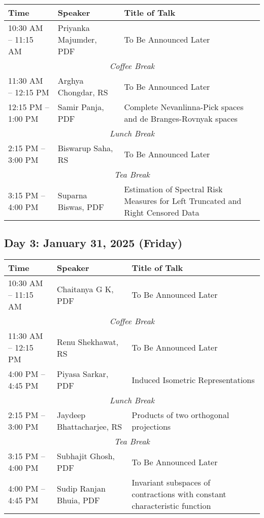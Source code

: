 \noindent
\renewcommand{\arraystretch}{1.5} %
\begin{tabular}{|p{3.5cm}|p{4cm}|p{7cm}|}
	\hline
	\textbf{Time} & \textbf{Speaker} & \textbf{Title of Talk} \\
	\hline
	10:30 AM -- 11:15 AM & Priyanka Majumder, PDF & To Be Announced Later \\
	\hline
	\multicolumn{3}{|c|}{\textit{Coffee Break}} \\
	\hline
	11:30 AM -- 12:15 PM & Arghya Chongdar, RS & To Be Announced Later \\
	\hline
	12:15 PM -- 1:00 PM & Samir Panja, PDF & Complete Nevanlinna-Pick spaces and de Branges-Rovnyak spaces \\
	\hline
	\multicolumn{3}{|c|}{\textit{Lunch Break}} \\
	\hline
	2:15 PM -- 3:00 PM & Biswarup Saha, RS & To Be Announced Later \\
	\hline
	\multicolumn{3}{|c|}{\textit{Tea Break}} \\
	\hline
	3:15 PM -- 4:00 PM & Suparna Biswas, PDF &  Estimation of Spectral Risk Measures for Left Truncated and Right Censored Data  \\
	\hline

\end{tabular}

\subsection*{Day 3: January 31, 2025 (Friday)}

\noindent
\renewcommand{\arraystretch}{1.5} %
\begin{tabular}{|p{3.5cm}|p{4cm}|p{7cm}|}
	\hline
	\textbf{Time} & \textbf{Speaker} & \textbf{Title of Talk} \\
	\hline
	10:30 AM -- 11:15 AM & Chaitanya G K, PDF & To Be Announced Later \\
	\hline
	\multicolumn{3}{|c|}{\textit{Coffee Break}} \\
	\hline
	11:30 AM -- 12:15 PM & Renu Shekhawat, RS & To Be Announced Later \\
	\hline
	4:00 PM -- 4:45 PM & Piyasa Sarkar, PDF & Induced Isometric Representations \\
	\hline
	\multicolumn{3}{|c|}{\textit{Lunch Break}} \\
	\hline
	2:15 PM -- 3:00 PM & Jaydeep Bhattacharjee, RS& Products of two orthogonal projections\\
	\hline
	\multicolumn{3}{|c|}{\textit{Tea Break}} \\
	\hline
	3:15 PM -- 4:00 PM & Subhajit Ghosh, PDF &  To Be Announced Later \\
	\hline

	4:00 PM -- 4:45 PM & Sudip Ranjan Bhuia, PDF & Invariant subspaces of contractions with constant characteristic function \\
	\hline
\end{tabular}
